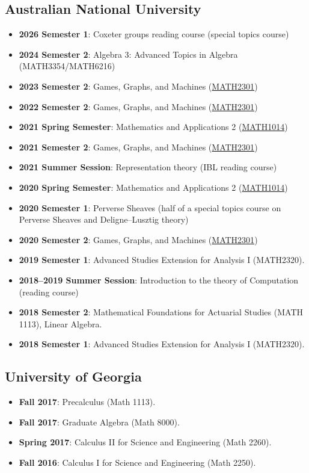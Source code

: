 \documentclass[a4paper]{moderncv}
\begin{document}
\subsection*{Australian National University}
\label{sec:org09cbc1e}
\begin{itemize}
\item \textbf{2026 Semester 1}: Coxeter groups reading course (special topics course)
\item \textbf{2024 Semester 2}: Algebra 3: Advanced Topics in Algebra (MATH3354/MATH6216)
\item \textbf{2023 Semester 2}: Games, Graphs, and Machines (\href{https://asilata.github.io/ggm/}{MATH2301})
\item \textbf{2022 Semester 2}: Games, Graphs, and Machines (\href{https://asilata.github.io/ggm/}{MATH2301})
\item \textbf{2021 Spring Semester}: Mathematics and Applications 2 (\href{https://programsandcourses.anu.edu.au/course/MATH1014}{MATH1014})
\item \textbf{2021 Semester 2}: Games, Graphs, and Machines (\href{https://asilata.github.io/ggm/}{MATH2301})
\item \textbf{2021 Summer Session}: Representation theory (IBL reading course)
\item \textbf{2020 Spring Semester}: Mathematics and Applications 2 (\href{https://programsandcourses.anu.edu.au/course/MATH1014}{MATH1014})
\item \textbf{2020 Semester 1}: Perverse Sheaves (half of a special topics course on Perverse Sheaves and Deligne--Lusztig theory)
\item \textbf{2020 Semester 2}: Games, Graphs, and Machines (\href{https://asilata.github.io/ggm/}{MATH2301})
\item \textbf{2019 Semester 1}: Advanced Studies Extension for Analysis I (MATH2320).
\item \textbf{2018–2019 Summer Session}: Introduction to the theory of Computation (reading course)
\item \textbf{2018 Semester 2}: Mathematical Foundations for Actuarial Studies (MATH 1113), Linear Algebra.
\item \textbf{2018 Semester 1}: Advanced Studies Extension for Analysis I (MATH2320).
\end{itemize}


\subsection*{University of Georgia}
\label{sec:org1d214ad}
\begin{itemize}
\item \textbf{Fall 2017}: Precalculus (Math 1113).
\item \textbf{Fall 2017}: Graduate Algebra (Math 8000).
\item \textbf{Spring 2017}: Calculus II for Science and Engineering (Math 2260).
\item \textbf{Fall 2016}: Calculus I for Science and Engineering (Math 2250).
\end{itemize}
\end{document}
